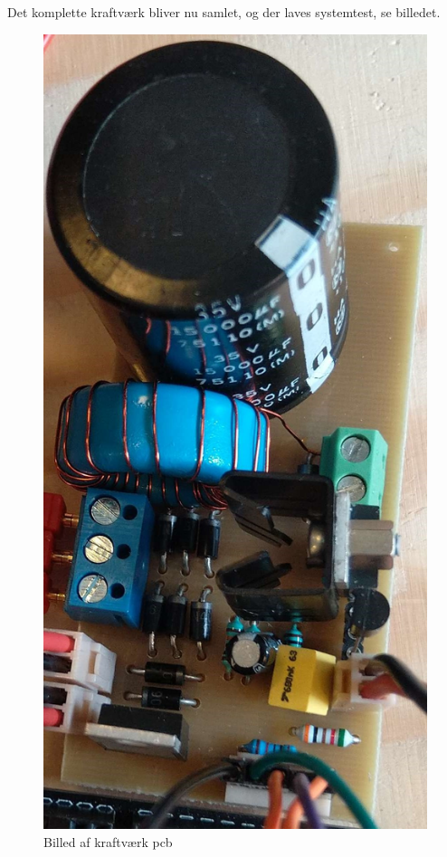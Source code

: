 \documentclass[../main.tex]{subfiles}
\begin{document}
Det komplette kraftværk bliver nu samlet, og der laves systemtest, se billedet.
\begin{figure}[H]
      \includegraphics[width=\textwidth]{Dokumentation/Pictures/PCB_kraft.jpg}
     \caption{Billed af kraftværk pcb}
     \label{fig: Kraftverk_pcb}
     \end{figure}
\end{document}
